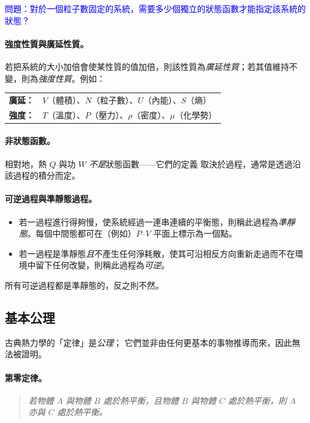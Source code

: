 \textcolor{blue}{問題：對於一個粒子數固定的系統，需要多少個獨立的狀態函數才能指定該系統的狀態？}

\paragraph{強度性質與廣延性質。}
若把系統的大小加倍會使某性質的值加倍，則該性質為\emph{廣延性質}；若其值維持不變，則為\emph{強度性質}。例如：
\begin{center}
\begin{tabular}{ll}
    \textbf{廣延：} & $V$（體積）、$N$（粒子數）、$U$（內能）、$S$（熵）\\
    \textbf{強度：} & $T$（溫度）、$P$（壓力）、$\rho$（密度）、$\mu$（化學勢）
\end{tabular}
\end{center}

\paragraph{非狀態函數。}
相對地，熱 $Q$ 與功 $W$ \emph{不是}狀態函數——它們的定義
取決於過程，通常是透過沿該過程的積分而定。

\paragraph{可逆過程與準靜態過程。}
\begin{itemize}
    \item 若一過程進行得夠慢，使系統經過一連串連續的平衡態，則稱此過程為\emph{準靜態}。每個中間態都可在（例如）$P$--$V$ 平面上標示為一個點。
    \item 若一過程是準靜態\emph{且}不產生任何淨耗散，使其可沿相反方向重新走過而不在環境中留下任何改變，則稱此過程為\emph{可逆}。
\end{itemize}
所有可逆過程都是準靜態的，反之則不然。
\subsection{基本公理}

古典熱力學的「定律」是\emph{公理}；
它們並非由任何更基本的事物推導而來，因此無法被證明。

\paragraph{第零定律。}
\begin{quote}
\textit{若物體 $A$ 與物體 $B$ 處於熱平衡，且物體 $B$ 與物體 $C$ 處於熱平衡，則 $A$ 亦與 $C$ 處於熱平衡。}
\end{quote}

